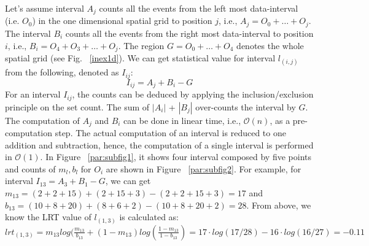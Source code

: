 \documentclass[AMA,LATO1COL]{WileyNJD-v2}
\newcommand\bigo{\mathcal O}
\begin{document}
Let's assume interval $A_j$ counts all the events from the left most data-interval (i.e. $O_0$) in the one dimensional spatial grid to position $j$, i.e., $A_j = O_0 + \ldots + O_j$. The interval $B_i$ counts all the events from the right most data-interval to position $i$, i.e., $B_i = O_4 + O_3 +  \ldots + O_{j}$. The region $G = O_0 + \ldots + O_4$ denotes the whole spatial grid (see Fig. ~\ref{inex1d}). We can get statistical value for interval $l_{(i,j)}$ from the following, denoted as $I_{ij}$:
\begin{equation}
I_{ij} = A_j  + B_i - G
\end{equation}
For an interval $I_{ij}$, the counts can be deduced by applying the inclusion/exclusion principle on the set count.  The sum of $|A_i|$ + $|B_j|$ over-counts the interval by $G$. The computation of $A_j$ and $B_i$ can be done in linear time, i.e., $\bigo(n)$, as a pre-computation step. The actual computation of an interval is reduced to one addition and subtraction, hence, the computation of a single interval is performed in
$\bigo(1)$.  In Figure ~\ref{par:subfig1}, it shows four interval composed by five points and counts of $m_l,b_l$ for $O_i$ are shown in Figure ~\ref{par:subfig2}. For example, for interval $I_{13}=A_3+B_1-G$, we can get $m_{13}=(2+2+15)+(2+15+3)-(2+2+15+3)=17$ and $b_{13}=(10+8+20)+(8+6+2)-(10+8+20+2)=28$. From above, we know the LRT value of $l_{(1,3)}$ is calculated as: $lrt_{(1,3)}=m_{13}log(\frac{m_{13}}{b_{13}}+(1-m_{13})log(\frac{1-m_{13}}{1-b_{13}})=17\cdot log(17/28)-16\cdot log(16/27)=-0.11$
\end{document}
